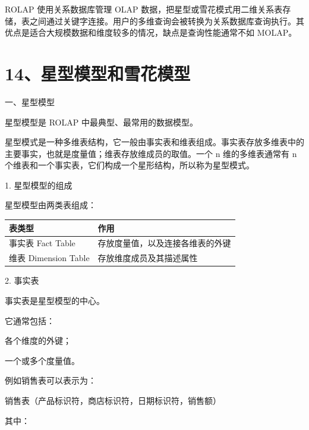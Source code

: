 \documentclass[UTF8,zihao=-4]{ctexart}
\begin{document}
ROLAP 使用关系数据库管理 OLAP 数据，把星型或雪花模式用二维关系表存储，表之间通过关键字连接。用户的多维查询会被转换为关系数据库查询执行。其优点是适合大规模数据和维度较多的情况，缺点是查询性能通常不如 MOLAP。\par

\newpage
\section*{14、星型模型和雪花模型}

一、星型模型\par

星型模型是 ROLAP 中最典型、最常用的数据模型。\par

星型模式是一种多维表结构，它一般由事实表和维表组成。事实表存放多维表中的主要事实，也就是度量值；维表存放维成员的取值。一个 n 维的多维表通常有 n 个维表和一个事实表，它们构成一个星形结构，所以称为星型模式。\par

1. 星型模型的组成\par

星型模型由两类表组成：\par

\begin{tabularx}{\linewidth}{|*{2}{>{\RaggedRight\arraybackslash}X|}}
\hline
表类型 & 作用 \\
\hline
事实表 Fact Table & 存放度量值，以及连接各维表的外键 \\
\hline
维表 Dimension Table & 存放维度成员及其描述属性 \\
\hline
\end{tabularx}

2. 事实表\par

事实表是星型模型的中心。\par

它通常包括：\par

各个维度的外键；\par
一个或多个度量值。\par

例如销售表可以表示为：\par

销售表（产品标识符，商店标识符，日期标识符，销售额）\par

其中：\par
\end{document}
